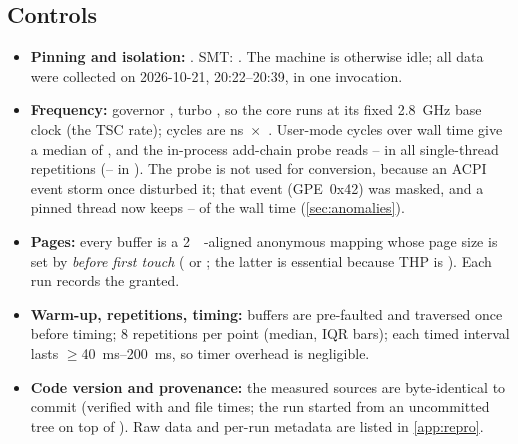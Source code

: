 \subsection{Controls}
\begin{itemize}[nosep, leftmargin=*]
  \item \textbf{Pinning and isolation:} \acspinning. SMT: \sysSMT. The machine is otherwise idle; all data
        were collected on 2026-10-21, 20:22--20:39, in one  invocation.
  \item \textbf{Frequency:} governor \sysGovernor, turbo \sysTurbo, so the core runs at its fixed
        \qty{2.8}{\giga\hertz} base clock (the TSC rate); cycles are ns~$\times$~.
        User-mode cycles over wall time give a median of , and the in-process
        add-chain probe reads -- in all 
        single-thread repetitions (-- in ).
        The probe is not used for conversion, because an ACPI event storm once disturbed it; that event
        (GPE~0x42) was masked, and a pinned thread now keeps -- of the
        wall time (\cref{sec:anomalies}).
  \item \textbf{Pages:} every buffer is a \qty{2}{\mebi\byte}-aligned anonymous mapping whose page size is set
        by  \emph{before first touch} ( or ; the latter
        is essential because THP is \sysHugePages{}). Each run records the  granted.
  \item \textbf{Warm-up, repetitions, timing:} buffers are pre-faulted and traversed once before timing; 8
        repetitions per point (median, IQR bars); each timed interval lasts
        $\geq$\qtyrange{40}{200}{\milli\second}, so timer overhead is negligible.
  \item \textbf{Code version and provenance:} the measured sources are byte-identical to commit
         (verified with  and file times; the run started from an uncommitted tree
        on top of ). Raw data and per-run metadata are listed in \cref{app:repro}.
\end{itemize}
